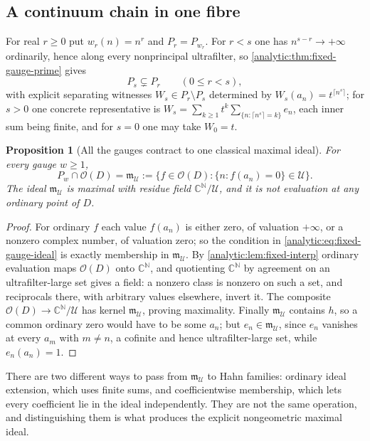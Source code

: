 \documentclass[11pt,letterpaper]{article}
\newtheorem{proposition}[theorem]{Proposition}
\theoremstyle{definition}
\theoremstyle{remark}
\newcommand{\C}{\mathbb C}
\newcommand{\N}{\mathbb N}
\newcommand{\UU}{\mathcal U}
\newcommand{\m}{\mathfrak m}
\newcommand{\OO}{\mathcal O}
\numberwithin{equation}{section}
\begin{document}
\subsection{A continuum chain in one fibre}
\label{analytic:subsec:fixed-fibre}
For real $r\ge0$ put $w_r(n)=n^r$ and $P_r=P_{w_r}$. For $r<s$ one has
$n^{s-r}\to+\infty$ ordinarily, hence along every nonprincipal
ultrafilter, so \cref{analytic:thm:fixed-gauge-prime} gives
\begin{equation}\label{analytic:eq:fixed-prime-chain}
 P_s\subsetneq P_r\qquad(0\le r<s),
\end{equation}
with explicit separating witnesses $W_s\in P_r\setminus P_s$ determined by
$W_s(a_n)=t^{\lceil n^s\rceil}$; for $s>0$ one concrete representative is
$W_s=\sum_{k\ge1}t^k\sum_{\{n:\lceil n^s\rceil=k\}}e_n$, each inner sum
being finite, and for $s=0$ one may take $W_0=t$.

\begin{proposition}[All the gauges contract to one classical maximal ideal]
\label{analytic:prop:fixed-contraction}
For every gauge $w\ge1$,
\begin{equation}\label{analytic:eq:fixed-contraction}
 P_w\cap\OO(D)=\m_\UU:=\{f\in\OO(D):\{n:f(a_n)=0\}\in\UU\}.
\end{equation}
The ideal $\m_\UU$ is maximal with residue field $\C^\N/\UU$, and it is
\emph{not} evaluation at any ordinary point of $D$.
\end{proposition}
\begin{proof}
For ordinary $f$ each value $f(a_n)$ is either zero, of valuation
$+\infty$, or a nonzero complex number, of valuation zero; so the
condition in \eqref{analytic:eq:fixed-gauge-ideal} is exactly membership in
$\m_\UU$. By \cref{analytic:lem:fixed-interp} ordinary evaluation maps
$\OO(D)$ onto $\C^\N$, and quotienting $\C^\N$ by agreement on an
ultrafilter-large set gives a field: a nonzero class is nonzero on such a
set, and reciprocals there, with arbitrary values elsewhere, invert it.
The composite $\OO(D)\to\C^\N/\UU$ has kernel $\m_\UU$, proving
maximality. Finally $\m_\UU$ contains $h$, so a common ordinary zero would
have to be some $a_n$; but $e_n\in\m_\UU$, since $e_n$ vanishes at every
$a_m$ with $m\ne n$, a cofinite and hence ultrafilter-large set, while
$e_n(a_n)=1$.
\end{proof}

There are two different ways to pass from $\m_\UU$ to Hahn families:
ordinary ideal extension, which uses finite sums, and coefficientwise
membership, which lets every coefficient lie in the ideal independently.
They are not the same operation, and distinguishing them is what produces
the explicit nongeometric maximal ideal.
\end{document}
